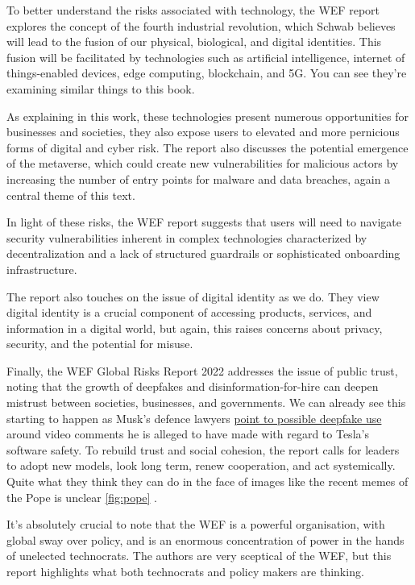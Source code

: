 To better understand the risks associated with technology, the WEF report explores the concept of the fourth industrial revolution, which Schwab believes will lead to the fusion of our physical, biological, and digital identities. This fusion will be facilitated by technologies such as artificial intelligence, internet of things-enabled devices, edge computing, blockchain, and 5G. You can see they're examining similar things to this book.\par 
As explaining in this work, these technologies present numerous opportunities for businesses and societies, they also expose users to elevated and more pernicious forms of digital and cyber risk. The report also discusses the potential emergence of the metaverse, which could create new vulnerabilities for malicious actors by increasing the number of entry points for malware and data breaches, again a central theme of this text.\par
In light of these risks, the WEF report suggests that users will need to navigate security vulnerabilities inherent in complex technologies characterized by decentralization and a lack of structured guardrails or sophisticated onboarding infrastructure.\par
The report also touches on the issue of digital identity as we do. They view digital identity is a crucial component of accessing products, services, and information in a digital world, but again, this raises concerns about privacy, security, and the potential for misuse.\par
Finally, the WEF Global Risks Report 2022 addresses the issue of public trust, noting that the growth of deepfakes and disinformation-for-hire can deepen mistrust between societies, businesses, and governments. We can already see this starting to happen as Musk's defence lawyers \href{https://www.theguardian.com/technology/2023/apr/27/elon-musks-statements-could-be-deepfakes-tesla-defence-lawyers-tell-court}{point to possible deepfake use} around video comments he is alleged to have made with regard to Tesla's software safety. To rebuild trust and social cohesion, the report calls for leaders to adopt new models, look long term, renew cooperation, and act systemically. Quite what they think they can do in the face of images like the recent memes of the Pope is unclear \ref{fig:pope} .\par 
It's absolutely crucial to note that the WEF is a powerful organisation, with global sway over policy, and is an enormous concentration of power in the hands of unelected technocrats. The authors are very sceptical of the WEF, but this report highlights what both technocrats and policy makers are thinking.

